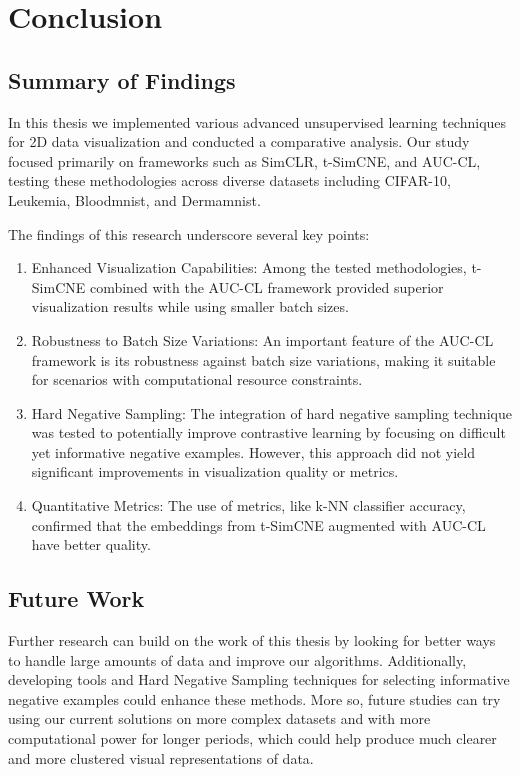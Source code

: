 \chapter{Conclusion}
\label{chap:conclusion}
\section{Summary of Findings}

In  this thesis we implemented various advanced unsupervised learning techniques for 2D data visualization and conducted a comparative analysis. Our study focused primarily on frameworks such as SimCLR, t-SimCNE, and AUC-CL, testing these methodologies across diverse datasets including CIFAR-10, Leukemia, Bloodmnist, and Dermamnist.

The findings of this research underscore several key points:
\begin{enumerate}
    \item {Enhanced Visualization Capabilities:} Among the tested methodologies, t-SimCNE combined with the AUC-CL framework provided superior visualization results while using smaller batch sizes. 
    \item {Robustness to Batch Size Variations:} An important feature of the AUC-CL framework is its robustness against batch size variations, making it suitable for scenarios with computational resource constraints.
    \item {Hard Negative Sampling:} The integration of hard negative sampling technique was tested to potentially improve contrastive learning by focusing on difficult yet informative negative examples. However, this approach did not yield significant improvements in visualization quality or metrics.
    \item {Quantitative Metrics:}  The use of metrics, like k-NN classifier accuracy, confirmed that the embeddings from t-SimCNE augmented with AUC-CL have better quality.
    
\end{enumerate}

\section{Future Work}

Further research can build on the work of this thesis by looking for better ways to handle large amounts of data and improve our algorithms. Additionally, developing tools and Hard Negative Sampling techniques for selecting informative negative examples could enhance these methods. More so, future studies can try using our current solutions on more complex datasets and with more computational power for longer periods, which could help produce much clearer and more clustered visual representations of data. 

